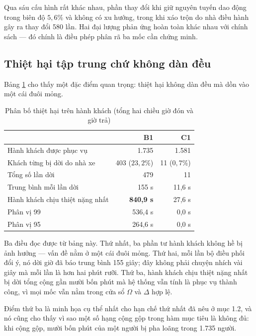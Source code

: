 \begin{khungy}
Qua sáu cấu hình rất khác nhau, phần thay đổi khi giữ nguyên tuyến dao động trong biên độ
$5{,}6\%$ và không có xu
hướng, trong khi xáo trộn do nhà điều hành gây ra thay đổi 580 lần. Hai đại lượng phản ứng hoàn
toàn khác nhau với chính sách --- đó chính là điều phép phân rã ba mốc cần chứng minh.
\end{khungy}

\subsection{Thiệt hại tập trung chứ không dàn đều}

Bảng \ref{bang:taptrung} cho thấy một đặc điểm quan trọng: thiệt hại không dàn đều mà dồn vào
một cái đuôi mỏng.

\begin{table}[htbp]
\centering
\caption{Phân bố thiệt hại trên hành khách (tổng hai chiều giờ đón và giờ trả)}
\label{bang:taptrung}
\small
\begin{tabular}{@{}lrr@{}}
\toprule
& \textbf{B1} & \textbf{C1}\\
\midrule
Hành khách được phục vụ & 1.735 & 1.581\\
Khách từng bị dời do nhà xe & 403 ($23{,}2\%$) & 11 ($0{,}7\%$)\\
Tổng số lần dời & 479 & 11\\
Trung bình mỗi lần dời & 155 s & 11{,}6 s\\
Hành khách chịu thiệt nặng nhất & \textbf{840{,}9 s} & 27{,}6 s\\
Phân vị 99 & 536{,}4 s & 0{,}0 s\\
Phân vị 95 & 264{,}6 s & 0{,}0 s\\
\bottomrule
\end{tabular}
\end{table}

Ba điều đọc được từ bảng này. Thứ nhất, ba phần tư hành khách không hề bị ảnh hưởng --- vấn đề
nằm ở một cái đuôi mỏng. Thứ hai, mỗi lần bộ điều phối đổi ý, nó dời giờ đã báo trung bình 155
giây; đây không phải chuyện nhích vài giây mà mỗi lần là hơn hai phút rưỡi. Thứ ba, hành khách
chịu thiệt nặng nhất bị dời tổng cộng gần mười bốn phút mà hệ thống vẫn tính là phục vụ thành
công, vì mọi mốc vẫn nằm trong cửa sổ $\Omega$ và $\Delta$ hợp lệ.

Điểm thứ ba là minh họa cụ thể nhất cho hạn chế thứ nhất đã nêu ở mục 1.2, và nó cũng cho thấy
vì sao một số hạng cộng gộp trong hàm mục tiêu là không đủ: khi cộng gộp, mười bốn phút của một
người bị pha loãng trong 1.735 người.

